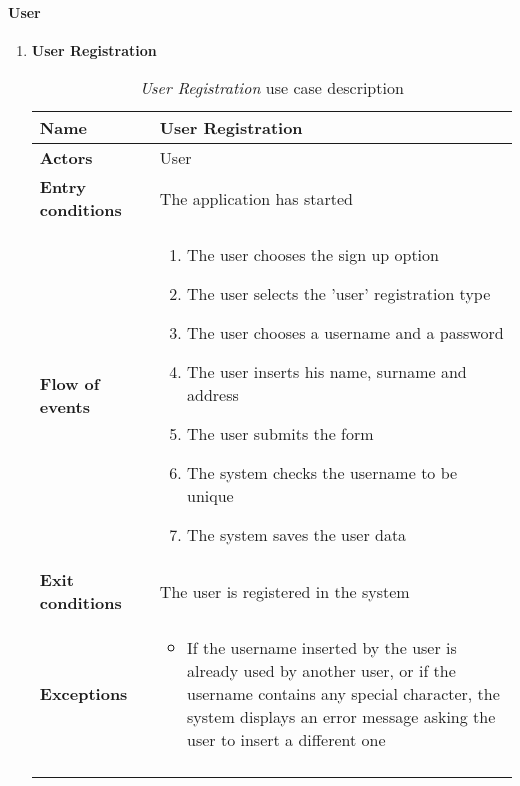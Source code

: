 	\paragraph{User}
	\begin{enumerate}
		\item \textbf{User Registration} 
			\begin{longtable}{p{0.25\linewidth}p{0.75\linewidth}}
				\toprule
				\textbf{Name} & \textbf{User Registration} \\
				\midrule
				\textbf{Actors} & User \\
				\midrule
				\textbf{Entry conditions} & The application has started \\
				\midrule
				\textbf{Flow of events} & 
				\begin{enumerate}
					\item The user chooses the sign up option
					\item The user selects the 'user' registration type
					\item The user chooses a username and a password
					\item The user inserts his name, surname and address
					\item The user submits the form
					\item The system checks the username to be unique
					\item The system saves the user data
				\end{enumerate} \\
				\midrule
				\textbf{Exit conditions} & The user is registered in the system\\
				\midrule
				\textbf{Exceptions} & 
				\begin{itemize}
					\item If the username inserted by the user is already used by another user, or if the username contains any special character, the system displays an error message asking the user to insert a different one
				\end{itemize} \\
				\bottomrule
				\caption{\emph{User Registration} use case description}
			\end{longtable}
		

\end{enumerate}
